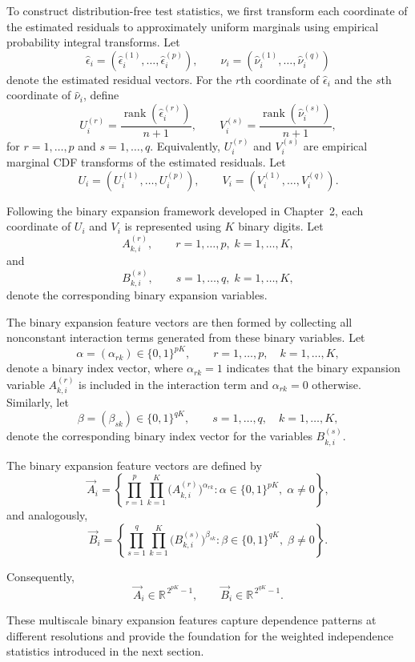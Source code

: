 \documentclass[12pt,reqno,oneside]{amsbook}
\theoremstyle{definition}
\theoremstyle{remark}
\begin{document}
To construct distribution-free test statistics, we first transform each coordinate
of the estimated residuals to approximately uniform marginals using empirical
probability integral transforms. Let
\[
\hat\epsilon_i
=
(\hat\epsilon_i^{(1)},\ldots,\hat\epsilon_i^{(p)}),
\qquad
\hat\nu_i
=
(\hat\nu_i^{(1)},\ldots,\hat\nu_i^{(q)})
\]
denote the estimated residual vectors. For the $r$th coordinate of
$\hat\epsilon_i$ and the $s$th coordinate of $\hat\nu_i$, define
\[
U_i^{(r)}
=
\frac{\operatorname{rank}(\hat\epsilon_i^{(r)})}{n+1},
\qquad
V_i^{(s)}
=
\frac{\operatorname{rank}(\hat\nu_i^{(s)})}{n+1},
\]
for $r=1,\ldots,p$ and $s=1,\ldots,q$.
Equivalently, $U_i^{(r)}$ and $V_i^{(s)}$ are empirical marginal CDF transforms
of the estimated residuals.
Let
\[
U_i=(U_i^{(1)},\ldots,U_i^{(p)}),
\qquad
V_i=(V_i^{(1)},\ldots,V_i^{(q)}).
\]

Following the binary expansion framework developed in Chapter~2, each coordinate
of $U_i$ and $V_i$ is represented using $K$ binary digits. Let
\[
A_{k,i}^{(r)}, \qquad r=1,\ldots,p,\; k=1,\ldots,K,
\]
and
\[
B_{k,i}^{(s)}, \qquad s=1,\ldots,q,\; k=1,\ldots,K,
\]
denote the corresponding binary expansion variables.

The binary expansion feature vectors are then formed by collecting all
nonconstant interaction terms generated from these binary variables.%
Let
\[
\alpha=(\alpha_{rk})
\in\{0,1\}^{pK},
\qquad
r=1,\ldots,p,\quad k=1,\ldots,K,
\]
denote a binary index vector, where $\alpha_{rk}=1$ indicates that the binary
expansion variable $A_{k,i}^{(r)}$ is included in the interaction term and
$\alpha_{rk}=0$ otherwise. Similarly, let
\[
\beta=(\beta_{sk})
\in\{0,1\}^{qK},
\qquad
s=1,\ldots,q,\quad k=1,\ldots,K,
\]
denote the corresponding binary index vector for the variables
$B_{k,i}^{(s)}$.

The binary expansion feature vectors are defined by
\[
\vec A_i
=
\left\{
\prod_{r=1}^{p}\prod_{k=1}^{K}
\bigl(A_{k,i}^{(r)}\bigr)^{\alpha_{rk}}
:
\alpha\in\{0,1\}^{pK},\;
\alpha\neq 0
\right\},
\]
and analogously,
\[
\vec B_i
=
\left\{
\prod_{s=1}^{q}\prod_{k=1}^{K}
\bigl(B_{k,i}^{(s)}\bigr)^{\beta_{sk}}
:
\beta\in\{0,1\}^{qK},\;
\beta\neq 0
\right\}.
\]

Consequently,
\[
\vec A_i\in\mathbb R^{\,2^{pK}-1},
\qquad
\vec B_i\in\mathbb R^{\,2^{qK}-1}.
\]

These multiscale binary expansion features capture dependence patterns at
different resolutions and provide the foundation for the weighted independence
statistics introduced in the next section.
\end{document}
